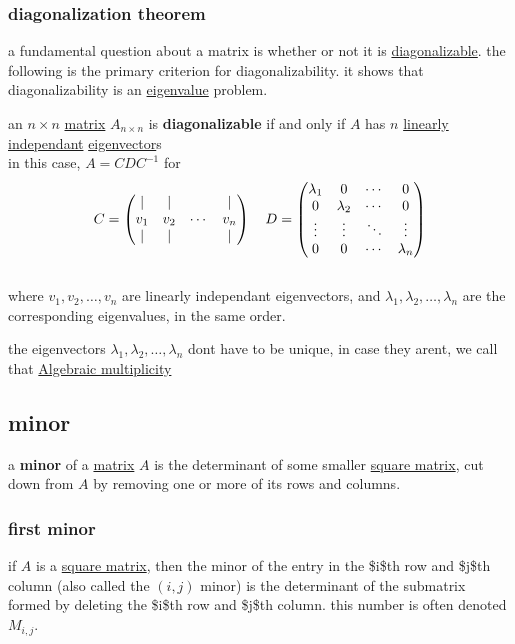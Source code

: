 \documentclass[a4paper,12pt]{article}
\begin{document}
\subsubsection{diagonalization theorem}
\label{sec:org072d977}
a fundamental question about a matrix is whether or not it is \hyperref[sec:org136aa39]{diagonalizable}. the following is the primary criterion for diagonalizability. it shows that diagonalizability is an \hyperref[sec:org929d22f]{eigenvalue} problem.\\
\begin{definition}
an \(n\times n\) \hyperref[sec:org2833a15]{matrix} \(A_{n\times n}\) is \textbf{diagonalizable} if and only if \(A\) has \(n\) \hyperref[sec:org174d95a]{linearly independant} \hyperref[sec:org929d22f]{eigenvector}s\\
in this case, \(A = CDC^{-1}\) for\\
\[
  C = \pmqty{\vert & \vert & & \vert\\ v_1 & v_2 & \cdots & v_n\\ \vert & \vert & & \vert} \quad D = \pmqty{\lambda_1 & 0 & \cdots & 0\\ 0 & \lambda_2 & \cdots & 0\\ \vdots & \vdots & \ddots & \vdots\\ 0 & 0 & \cdots & \lambda_n}
\]\\
where \(v_1,v_2,\ldots,v_n\) are linearly independant eigenvectors, and \(\lambda_1,\lambda_2,\ldots,\lambda_n\) are the corresponding eigenvalues, in the same order.\\
\begin{note}
the eigenvectors \(\lambda_1,\lambda_2,\ldots,\lambda_n\) dont have to be unique, in case they arent, we call that \href{20220731205450-algebraic_multiplicity.org}{Algebraic multiplicity}\\
\end{note}
\end{definition}
\subsection{minor}
\label{sec:org75038da}
\begin{definition}
a \textbf{minor} of a \hyperref[sec:org2833a15]{matrix} \(A\) is the determinant of some smaller \hyperref[sec:orgf670bc9]{square matrix}, cut down from \(A\) by removing one or more of its rows and columns.\\
\end{definition}
\subsubsection{first minor}
\label{sec:org4a814ef}
\begin{definition}
if \(A\) is a \hyperref[sec:orgf670bc9]{square matrix}, then the minor of the entry in the \$i\$th row and \$j\$th column (also called the \((i,j)\) minor) is the determinant of the submatrix formed by deleting the \$i\$th row and \$j\$th column. this number is often denoted \(M_{i,j}\).\\
\end{definition}
\end{document}
